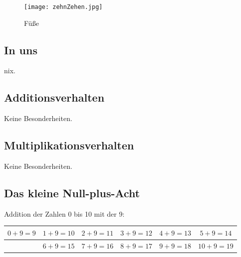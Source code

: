 \documentclass[a4paper]{amsart}
\theoremstyle{definition}
\begin{document}
\begin{figure}
   \texttt{[image: zehnZehen.jpg]}
   \caption{Füße}
\end{figure}

\subsection{In uns}
nix.

\subsection{Additionsverhalten}
Keine Besonderheiten.

\subsection{Multiplikationsverhalten}
Keine Besonderheiten.

\subsection{Das kleine Null-plus-Acht}
Addition der Zahlen 0 bis 10 mit der 9:
\vspace{\kategoryVspace}

\begin{tabular}{|c|c|c|c|c|c|}
   \hline
   $0 + 9 = 9$ & $1 + 9 = 10$ & $2 + 9 = 11$ & $3 + 9 = 12$ & $4 + 9 = 13$ & $5 + 9 = 14$\\ 
   \hline
               & $6 + 9 = 15$ & $7 + 9 = 16$ & $8 + 9 = 17$ & $9 + 9 = 18$ & $10 + 9 = 19$ \\
   \hline
\end{tabular}

\end{document}
